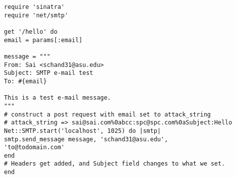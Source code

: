 \begin{lstlisting}
require 'sinatra'
require 'net/smtp'

get '/hello' do
email = params[:email]

message = """
From: Sai <schand31@asu.edu>
Subject: SMTP e-mail test
To: #{email}

This is a test e-mail message.
"""
# construct a post request with email set to attack_string
# attack_string => sai@sai.com%0abcc:spc@spc.com%0aSubject:Hello
Net::SMTP.start('localhost', 1025) do |smtp|
smtp.send_message message, 'schand31@asu.edu',
'to@todomain.com'
end
# Headers get added, and Subject field changes to what we set.
end
\end{lstlisting}